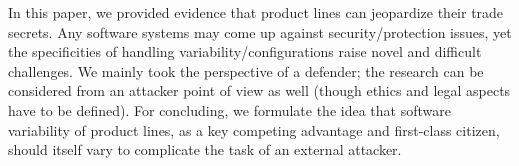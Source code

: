 In this paper, we provided evidence that product lines can jeopardize their trade secrets. 
 Any software systems may come up against security/protection issues, yet the specificities of handling variability/configurations raise novel and difficult challenges. 
We mainly took the perspective of a defender; the research can be considered from an attacker point of view as well (though ethics and legal aspects have to be defined). 
 For concluding, we formulate the idea that software variability of product lines, as a key competing advantage and first-class citizen, should itself vary to complicate the task of an external attacker. %



